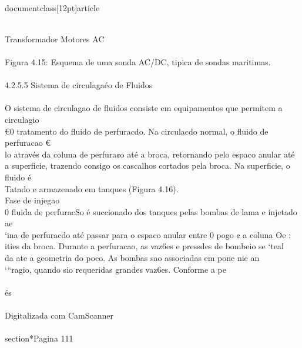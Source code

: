 \\documentclass[12pt]{article}
\begin{document}
\\
Transformador Motores AC\\
\\
Figura 4.15: Esquema de uma sonda AC/DC, tipica de sondas maritimas.\\
\\
4.2.5.5 Sistema de circulagaéo de Fluidos\\
\\
O sistema de circulagao de fluidos consiste em equipamentos que permitem a circulagio\\
€0 tratamento do fluido de perfuracdo. Na circulacdo normal, o fluido de perfuracao €\\
lo através da coluna de perfura¢o até a broca, retornando pelo espaco anular até\\
a superficie, trazendo consigo os cascalhos cortados pela broca. Na superficie, o fluido é\\
Tatado e armazenado em tanques (Figura 4.16).\\
Fase de injegao\\
0 fluida de perfuracSo é succionado dos tanques pelas bombas de lama e injetado ae\\
‘ina de perfuracdo até passar para o espaco anular entre 0 pogo ¢ a coluna Oe :\\
ities da broca. Durante a perfuracao, as vaz6es e pressdes de bombeio se ‘teal\\
da ate a geometria do poco. As bombas sao associadas em pone nie an\\
‘“ragio, quando sio requeridas grandes vaz6es. Conforme a pe\\
\\
és\\
\\
Digitalizada com CamScanner\\

\\section*{Pagina 111}
\end{document}
